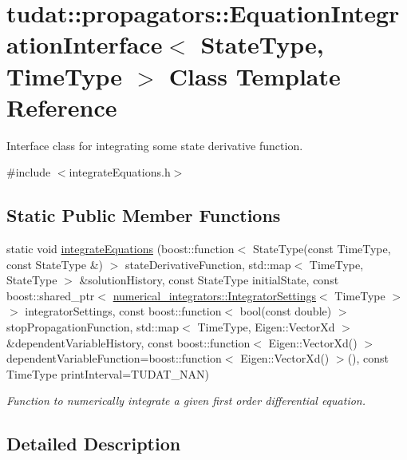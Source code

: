 \hypertarget{classtudat_1_1propagators_1_1EquationIntegrationInterface}{}\section{tudat\+:\+:propagators\+:\+:Equation\+Integration\+Interface$<$ State\+Type, Time\+Type $>$ Class Template Reference}
\label{classtudat_1_1propagators_1_1EquationIntegrationInterface}


Interface class for integrating some state derivative function.  




{\ttfamily \#include $<$integrate\+Equations.\+h$>$}

\subsection*{Static Public Member Functions}
\begin{DoxyCompactItemize}
\item 
static void \hyperlink{classtudat_1_1propagators_1_1EquationIntegrationInterface_ad2a5d747afded7138730b957f74a3624}{integrate\+Equations} (boost\+::function$<$ State\+Type(const Time\+Type, const State\+Type \&) $>$ state\+Derivative\+Function, std\+::map$<$ Time\+Type, State\+Type $>$ \&solution\+History, const State\+Type initial\+State, const boost\+::shared\+\_\+ptr$<$ \hyperlink{classtudat_1_1numerical__integrators_1_1IntegratorSettings}{numerical\+\_\+integrators\+::\+Integrator\+Settings}$<$ Time\+Type $>$ $>$ integrator\+Settings, const boost\+::function$<$ bool(const double) $>$ stop\+Propagation\+Function, std\+::map$<$ Time\+Type, Eigen\+::\+Vector\+Xd $>$ \&dependent\+Variable\+History, const boost\+::function$<$ Eigen\+::\+Vector\+Xd() $>$ dependent\+Variable\+Function=boost\+::function$<$ Eigen\+::\+Vector\+Xd() $>$(), const Time\+Type print\+Interval=T\+U\+D\+A\+T\+\_\+\+N\+AN)
\begin{DoxyCompactList}\small\item\em Function to numerically integrate a given first order differential equation. \end{DoxyCompactList}\end{DoxyCompactItemize}


\subsection{Detailed Description}

